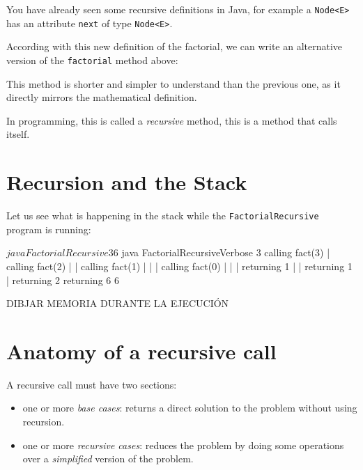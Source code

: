 \documentclass[a4paper, 9pt]{extarticle}
\begin{document}
You have already seen some recursive definitions in Java, for example a \verb+Node<E>+ has an attribute \texttt{next} of type \verb+Node<E>+.

According with this new definition of the factorial, we can write an
alternative version of the \verb+factorial+ method above:

\begin{multicols}{2}
\columnbreak
{}
\end{multicols}

This method is shorter and simpler to understand than the previous one, as it
directly mirrors the mathematical definition.

In programming, this is called a \emph{recursive} method, this is a method that calls itself.





\section{Recursion and the Stack}

Let us see what is happening in the stack while the \texttt{FactorialRecursive} program is running:

\begin{blackboard}
$ java FactorialRecursive 3
6
$ java FactorialRecursiveVerbose 3
calling fact(3)
|  calling fact(2)
|  |  calling fact(1)
|  |  |  calling fact(0)
|  |  |  returning 1
|  |  returning 1
|  returning 2
returning 6
6
\end{blackboard}

DIBJAR MEMORIA DURANTE LA EJECUCIÓN




\section{Anatomy of a recursive call}

A recursive call must have two sections:

\begin{itemize}

\item one or more \emph{base cases}: returns a direct solution to the problem
  without using recursion.


\item one or more \emph{recursive cases}: reduces the problem by doing some
  operations over a \emph{simplified} version of the problem.


\end{itemize}
\end{document}
